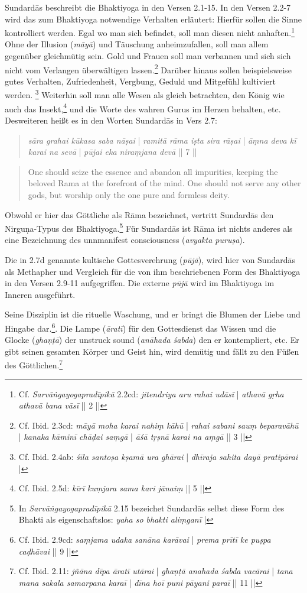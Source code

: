 Sundardās beschreibt die Bhaktiyoga in den Versen 2.1-15. In den Versen 2.2-7 wird das zum Bhaktiyoga notwendige Verhalten erläutert: Hierfür sollen die Sinne kontrolliert werden. Egal wo man sich befindet, soll man diesen nicht anhaften.\footnote{Cf. \emph{Sarvāṅgayogapradīpikā} 2.2cd: \textit{jitendriya aru rahai udāsī} | \textit{athavā gṛha athavā bana vāsī} || 2 ||} Ohne der Illusion (\textit{māyā}) und Täuschung anheimzufallen, soll man allem gegenüber gleichmütig sein. Gold und Frauen soll man verbannen und sich sich nicht vom Verlangen überwältigen lassen.\footnote{Cf. Ibid. 2.3cd: \textit{māyā moha karai nahiṃ kāhū} | \textit{rahai sabani sauṃ beparavāhū} | \textit{kanaka kāminī chāḍai saṃgā} | \textit{āśā tṛṣnā karai na aṃgā} || 3 ||} Darüber hinaus sollen beispielsweise gutes Verhalten, Zufriedenheit, Vergbung, Geduld und Mitgefühl kultiviert werden. \footnote{Cf. Ibid. 2.4ab: \textit{śīla santoṣa kṣamā ura ghārai} | \textit{dhīraja sahita dayā pratipārai} |} Weiterhin soll man alle Wesen als gleich betrachten, den König wie auch das Insekt,\footnote{Cf. Ibid. 2.5d: \textit{kīrī kuṃjara sama kari jānaiṃ} || 5 ||} und die Worte des wahren Gurus im Herzen behalten, etc. Desweiteren heißt es in den Worten Sundardās in Vers 2.7:
\begin{quote}
\textit{sāra grahai kūkasa saba nāṣai} | \textit{ramitā rāma iṣta sira rāṣai} | 
\textit{āṃna deva kī karai na sevā} | \textit{pūjai eka niraṃjana devā} || 7 ||
\end{quote}
\begin{quote}
One should seize the essence and abandon all impurities, keeping the beloved Rama at the forefront of the mind. One should not serve any other gods, but worship only the one pure and formless deity.
\end{quote}

Obwohl er hier das Göttliche als Rāma bezeichnet, vertritt Sundardās den Nirguṇa-Typus des Bhaktiyoga.\footnote{In \textit{Sarvāṅgayogapradīpikā} 2.15 bezeichet Sundardās selbst diese Form des Bhakti als eigenschaftslos: \textit{yaha so bhakti aliṃganī} |} Für Sundardās ist Rāma ist nichts anderes als eine Bezeichnung des unnmanifest consciousness (\textit{avyakta puruṣa}).  

Die in 2.7d genannte kultische Gottesverehrung (\textit{pūjā}), wird hier von Sundardās als Methapher und Vergleich für die von ihm beschriebenen Form des Bhaktiyoga in den Versen 2.9-11 aufgegriffen. Die externe \textit{pūjā} wird im Bhaktiyoga im Inneren ausgeführt.

Seine Disziplin ist die rituelle Waschung, und er bringt die Blumen der Liebe und Hingabe dar.\footnote{Cf. Ibid. 2.9cd: \textit{saṃjama udaka sanāna karāvai} | \textit{prema prītī ke puṣpa caḍhāvai} || 9 || }. Die Lampe (\textit{āratī}) für den Gottesdienst das Wissen und die Glocke (\textit{ghaṇṭā}) der unstruck sound (\textit{anāhada śabda}) den er kontempliert, etc. Er gibt seinen gesamten Körper und Geist hin, wird demütig und fällt zu den Füßen des Göttlichen.\footnote{Cf. Ibid. 2.11: \textit{jñāna dīpa āratī utārai} | \textit{ghaṇṭā anahada śabda vacārai} | \textit{tana mana sakala samarpana karaī} | \textit{dīna hoī puni pāyani paraī} || 11 ||}

